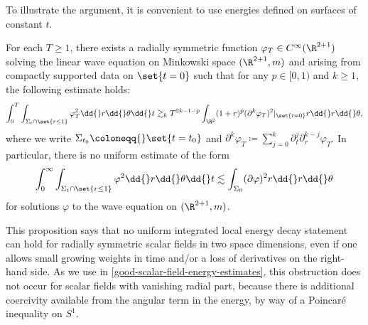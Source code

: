 \documentclass[10pt, reqno]{amsart}
\begin{document}
To illustrate the argument, it is convenient to use energies defined on surfaces
of constant \(t\).
\begin{proposition}
For each \(T\ge 1\), there exists a radially symmetric function \(\varphi_T\in C^\infty(\R^{2 +
1})\) solving the linear wave equation on Minkowski space \((\R^{2 + 1},m)\) and
arising from compactly supported data on \(\set{t=0}\) such that for any \(p\in
[0,1)\) and \(k\ge 1\), the following estimate holds:
\begin{equation}
\int_0^T \int _{\Sigma{}_t\cap \set{r\le 1}}\varphi{}_T^2\dd{}r\dd{}\theta{}\dd{}t \gtrsim_k T^{2k-1-p}\int _{\R^2}(1+r)^p(\partial^k\varphi{}_T)^2|_{\set{t=0}}r\dd{}r\dd{}\theta{},
\end{equation}
where we write \(\Sigma_{t_0}\coloneqq{}\set{t=t_0}\) and
\(\partial^k\varphi_T\coloneqq{}\sum_{j=0}^k\partial_t^j\partial_r^{k-j}\varphi_T\). In particular, there is no uniform
estimate of the form
\begin{equation}
\int_0^\infty \int _{\Sigma{}_t\cap \set{r\le 1}}\varphi^2\dd{}r\dd{}\theta{}\dd{}t\lesssim \int _{\Sigma{}_0}(\partial{}\varphi{})^2 r\dd{}r\dd{}\theta{}
\end{equation}
for solutions \(\varphi{}\) to the wave equation on \((\R^{2+1},m)\).
\label{failure-of-iled}
\end{proposition}
\begin{remark}
This proposition says that no uniform integrated local energy decay statement
can hold for radially symmetric scalar fields in two space dimensions, even if
one allows small growing weights in time and/or a loss of derivatives on the
right-hand side. As we use in \cref{good-scalar-field-energy-estimates}, this
obstruction does not occur for scalar fields with vanishing radial part, because
there is additional coercivity available from the angular term in the energy, by
way of a Poincaré inequality on \(S^1\).
\end{remark}
\end{document}
